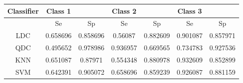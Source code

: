 \begin{tabular}{|c|c|c|c|c|c|c|}
 \hline 
Classifier & Class 1 &  & Class 2 &  & Class 3 &  \\ 
 \hline 
 & Se & Sp & Se & Sp & Se & Sp \\ 
 \hline 
LDC & 0.658696 & 0.858696 & 0.56087 & 0.882609 & 0.901087 & 0.857971 \\ 
 \hline 
QDC & 0.495652 & 0.978986 & 0.936957 & 0.669565 & 0.734783 & 0.927536 \\ 
 \hline 
KNN & 0.651087 & 0.87971 & 0.554348 & 0.880978 & 0.932609 & 0.852899 \\ 
 \hline 
SVM & 0.642391 & 0.905072 & 0.658696 & 0.859239 & 0.926087 & 0.881159 \\ 
 \hline 
\end{tabular}